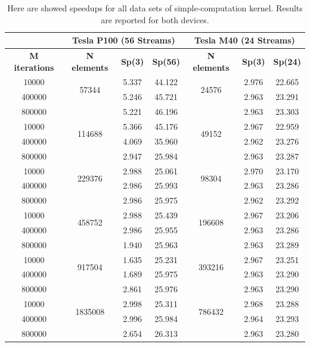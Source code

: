 			
	\begin{table}	
		\centering
		\begin{tabular}{ | c ||  c | c | c  || c | c | c | } 
			\hline
			& \multicolumn{3}{c}{\textbf{Tesla P100 (56 Streams)}} & \multicolumn{3}{c}{\textbf{Tesla M40 (24 Streams)}}\\ [0.5ex]
			\hline
		\textbf{M iterations}  & \textbf{N elements} & \textbf{Sp(3)} & \textbf{Sp(56)} & \textbf{N elements}  & \textbf{Sp(3)} & \textbf{Sp(24)} \\
			\hline\hline 
			10000&	\multirow{2}{*}{57344} &	5.337&	44.122&		\multirow{2}{*}{24576}&	2.976&	22.665\\
			400000&	&	5.246&	45.721&	&	2.963&	23.291\\
			800000&	&	5.221&	46.196&	&	2.963&	23.303\\
			\hline
			10000&	\multirow{2}{*}{114688}&	5.366&	45.176&		\multirow{2}{*}{49152}&	2.967&	22.959\\
			400000&	&	4.069&	35.960&	&	2.962&	23.276\\
			800000&	&	2.947&	25.984&	&	2.963&	23.287\\
			\hline
			10000&	\multirow{2}{*}{229376}&	2.988&	25.061&		\multirow{2}{*}{98304}&	2.970&	23.170\\
			400000&	&	2.986&	25.993&	&	2.963&	23.286\\
			800000&	&	2.986&	25.975&	&	2.962&	23.292\\
			\hline
			10000&	\multirow{2}{*}{458752}&	2.988&	25.439&		\multirow{2}{*}{196608}&	2.967&	23.206\\
			400000&	&	2.986&	25.955&	&	2.963&	23.286\\
			800000&	&	1.940&	25.963&	&	2.963&	23.289\\
			\hline
			10000&	\multirow{2}{*}{917504}&	1.635&	25.231&		\multirow{2}{*}{393216}&	2.967&	23.251\\
			400000&	&	1.689&	25.975&	&	2.963&	23.290\\
			800000&	&	2.861&	25.976&	&	2.963&	23.290\\
			\hline
			10000&	\multirow{2}{*}{1835008}&	2.998&	25.311&		\multirow{2}{*}{786432}&	2.968&	23.288\\
			400000&	&	2.996&	25.984&	&	2.964&	23.293\\
			800000&	&	2.654&	26.313&	&	2.963&	23.280\\	
		\hline			
		\end{tabular}
		\caption{Here are showed speedups for all data sets of simple-computation kernel. Results are reported for both devices.}	
		\label{tab:cosspeedup}		
	\end{table}
			
